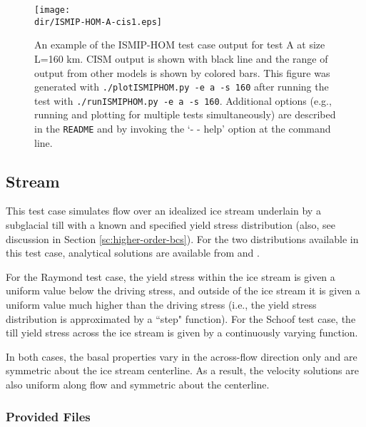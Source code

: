 \begin{figure}[H!]
	\centering
	\texttt{[image: \\dir/ISMIP-HOM-A-cis1.eps]}
	\caption{An example of the ISMIP-HOM test case output for test A at size L=160 km. 
CISM output is shown with black line and the range of output from other models is shown by colored bars. 
This figure was generated with \texttt{./plotISMIPHOM.py -e a -s 160} after running the test with \texttt{./runISMIPHOM.py -e a -s 160}.
Additional options (e.g., running and plotting for multiple tests simultaneously) are described in the \texttt{README} and by invoking the
`- - help' option at the command line.}
	\label{fig:ismiphom-results}
\end{figure}
\FloatBarrier

\subsection{Stream}

This test case simulates flow over an idealized ice stream underlain by a subglacial till with a known and specified
yield stress distribution (also, see discussion in Section \ref{sc:higher-order-bcs}). For the two distributions available in this test case, 
analytical solutions are available from \citet{Raymond2000} and \citet{Schoof2006}. 

For the Raymond test case, the yield stress within the ice stream is given a uniform value below the driving stress, and outside of the
ice stream it is given a uniform value much higher than the driving stress (i.e., the yield stress distribution is approximated by a
``step" function). For the Schoof test case, the till yield stress across the ice stream is given by a continuously varying function.

In both cases, the basal properties vary in the across-flow direction only and are symmetric about the ice stream centerline.
As a result, the velocity solutions are also uniform along flow and symmetric about the centerline.

\subsubsection{Provided Files}

